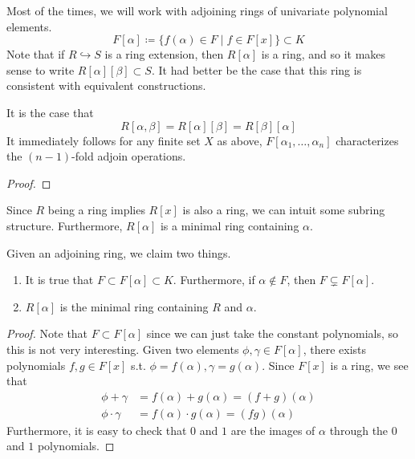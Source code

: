   Most of the times, we will work with adjoining rings of univariate polynomial elements. 
  \begin{equation}
    F[\alpha] \coloneqq \{ f(\alpha) \in F \mid f \in F[x]\} \subset K
  \end{equation} 
  Note that if $R \hookrightarrow S$ is a ring extension, then $R[\alpha]$ is a ring, and so it makes sense to write $R[\alpha][\beta] \subset S$. It had better be the case that this ring is consistent with equivalent constructions. 

  \begin{lemma}
    It is the case that 
    \begin{equation}
      R[\alpha, \beta] = R[\alpha][\beta] = R[\beta][\alpha]
    \end{equation}
    It immediately follows for any finite set $X$ as above, $F[\alpha_1, \ldots, \alpha_n]$ characterizes the $(n-1)$-fold adjoin operations. 
  \end{lemma}
  \begin{proof}
    
  \end{proof}

  Since $R$ being a ring implies $R[x]$ is also a ring, we can intuit some subring structure. Furthermore, $R[\alpha]$ is a minimal ring containing $\alpha$. 

  \begin{lemma} 
    Given an adjoining ring, we claim two things. 
    \begin{enumerate}
      \item It is true that $F \subset F[\alpha] \subset K$. Furthermore, if $\alpha \not\in F$, then $F \subsetneq F[\alpha]$. 
      \item $R[\alpha]$ is the minimal ring containing $R$ and $\alpha$. 
    \end{enumerate}
  \end{lemma}
  \begin{proof}
    Note that $F \subset F[\alpha]$ since we can just take the constant polynomials, so this is not very interesting. Given two elements $\phi, \gamma \in F[\alpha]$, there exists polynomials $f, g \in F[x]$ s.t. $\phi = f(\alpha), \gamma = g(\alpha)$. Since $F[x]$ is a ring, we see that 
    \begin{align}
      \phi + \gamma & = f(\alpha) + g(\alpha) = (f + g)(\alpha) \\
      \phi \cdot \gamma & = f(\alpha) \cdot g(\alpha) = (fg)(\alpha)
    \end{align} 
    Furthermore, it is easy to check that $0$ and $1$ are the images of $\alpha$ through the $0$ and $1$ polynomials. 
  \end{proof} 

